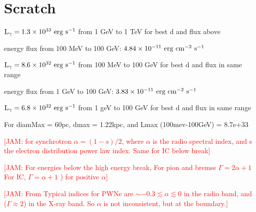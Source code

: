 \documentclass[iop]{emulateapj}
\newcommand{\kibitz}[2]{\ifnum\Comments=1\textcolor{#1}{#2}\fi}
\newcommand{\jamie}[1]{\kibitz{red}      {[JAM: #1]}}
\newcommand{\gam}{$\gamma$-ray}
\newcommand{\Gone}{G150.3+4.5}
\begin{document}

\section{Scratch}

${\rm L_{\gamma} = 1.3 \times 10^{33}~erg~s^{-1}}$ from 1 GeV to 1 TeV for best d and flux above


energy flux from 100 MeV to 100 GeV: ${\rm 4.84 \times 10^{-11}~erg~cm^{-2}~s^{-1}} $

${\rm L_{\gamma} = 8.6 \times 10^{32}~erg~s^{-1}}$ from 100 MeV to 100 GeV for best d and flux in same range

energy flux from 1 GeV to 100 GeV: ${\rm 3.83 \times 10^{-11}~erg~cm^{-2}~s^{-1}} $

${\rm L_{\gamma} = 6.8 \times 10^{32}~erg~s^{-1}}$ from 1 geV to 100 GeV for best d and flux in same range

For diamMax = 60pc, dmax = 1.22kpc, and Lmax (100mev-100GeV) = 8.7e+33


\jamie{for synchrotron $\alpha = (1-s)/2$, where $\alpha$ is the radio spectral index, and s the electron distribution power law index. Same for IC below break}%



\jamie{For energies below the high energy break, For pion and bremss $\Gamma = 2\alpha + 1$ For IC, $\Gamma = \alpha + 1 $ ) for positive $\alpha$} %

\jamie{From \cite{Gaensler06} Typical indices for PWNe are $\sim -0.3 \lesssim \alpha  \lesssim  0$ in the radio band, and ($\Gamma \approx 2$) in the X-ray band. So $\alpha$ is not inconsistent, but at the boundary.}




%
%


%

\end{document}
